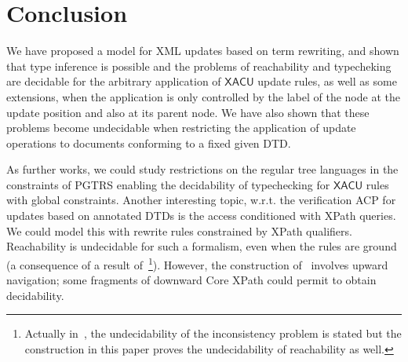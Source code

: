 \documentclass[a4paper]{article}
\newcommand{\remarque}[1]{}
\theoremstyle{plain}
\newcommand{\XACU}{\textsf{XACU}}
\begin{document}
\section*{Conclusion}
We have proposed a model for XML updates based on term rewriting,
and shown that type inference is possible
and the problems of reachability and typecheking are decidable
for the arbitrary application of $\XACU$ update rules, as well as some extensions,
when the application is only controlled by the label of the node at the update position 
and also at its parent node.
We have also shown that these problems become undecidable
when restricting the application of update operations 
to documents conforming to a fixed given DTD. 
\remarque{DTD or regular tree language ?}

As further works, we could study restrictions on the
regular tree languages in the constraints of PGTRS enabling 
the decidability of typechecking for $\XACU$ rules
with global constraints.
Another interesting topic, w.r.t. the verification 
ACP for updates based on annotated DTDs
is the access conditioned with XPath queries.
We could model this with rewrite rules constrained by XPath qualifiers.
Reachability is undecidable for such a formalism,
even when the rules are ground (a consequence of a result 
of~\cite{FundulakiManeth07}\footnote{Actually in~\cite{FundulakiManeth07}, the undecidability of the inconsistency problem
is stated but the construction in this paper proves the undecidability of reachability as well.}).
However, the construction of~\cite{FundulakiManeth07} involves upward navigation;
some fragments of downward Core XPath could permit to obtain decidability.
\end{document}
